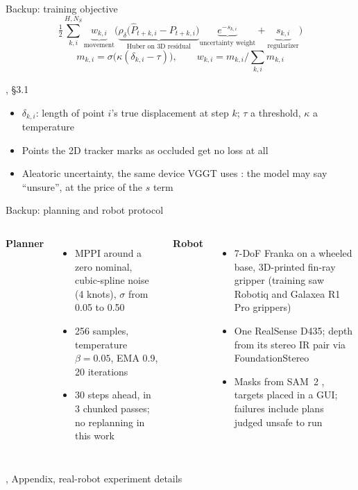 \documentclass[aspectratio=169,12pt]{beamer}
\newcommand{\src}[1]{{\scriptsize\color{mute}\citep{#1}}}
\newcommand{\credit}[1]{\par\hfill{\tiny\color{mute}\citet{huang2026pointworld}, #1}\par}
\newenvironment{notes}[1][\linewidth]
  {\begin{minipage}{#1}\footnotesize\begin{itemize}\setlength{\itemsep}{2pt}}
  {\end{itemize}\end{minipage}}
\begin{document}
\begin{frame}{Backup: training objective}
  \small
  \[
    \tfrac12 \sum_{k,i}^{H, N_S}
    \underbrace{w_{k,i}}_{\text{movement}}
    \Big( \underbrace{\rho_\delta\big(\hat P_{t+k,i} - P_{t+k,i}\big)}_{\text{Huber on 3D residual}}
    \underbrace{e^{-s_{k,i}}}_{\text{uncertainty weight}}
    + \underbrace{s_{k,i}}_{\text{regularizer}} \Big)
    \tag{1}
  \]
  \[
    m_{k,i} = \sigma\big(\kappa(\delta_{k,i} - \tau)\big), \qquad
    w_{k,i} = m_{k,i} \Big/ \textstyle\sum_{k,i} m_{k,i}
  \]
  \credit{\S3.1}
  \vfill
  \begin{notes}
    \item $\delta_{k,i}$: length of point $i$'s true displacement at step $k$; $\tau$ a
      threshold, $\kappa$ a temperature
    \item Points the 2D tracker marks as occluded get no loss at all
    \item Aleatoric uncertainty, the same device VGGT uses \src{wang2025vggt}: the model may
      say ``unsure'', at the price of the $s$ term
  \end{notes}
\end{frame}

\begin{frame}{Backup: planning and robot protocol}
  \footnotesize
  \begin{columns}[t]
      {\small\bfseries Planner}
      \begin{itemize}\setlength{\itemsep}{2pt}
        \item MPPI around a zero nominal, cubic-spline noise (4 knots), $\sigma$ from 0.05
          to 0.50
        \item 256 samples, temperature $\beta = 0.05$, EMA 0.9, 20 iterations
        \item 30 steps ahead, in 3 chunked passes; no replanning in this work
      \end{itemize}
      {\small\bfseries Robot}
      \begin{itemize}\setlength{\itemsep}{2pt}
        \item 7-DoF Franka on a wheeled base, 3D-printed fin-ray gripper (training saw
          Robotiq and Galaxea R1 Pro grippers)
        \item One RealSense D435; depth from its stereo IR pair via FoundationStereo
        \item Masks from SAM~2 \src{ravi2024sam2}, targets placed in a GUI; failures include
          plans judged unsafe to run
      \end{itemize}
  \end{columns}
  \vspace{4pt}\credit{Appendix, real-robot experiment details}
\end{frame}
\end{document}
